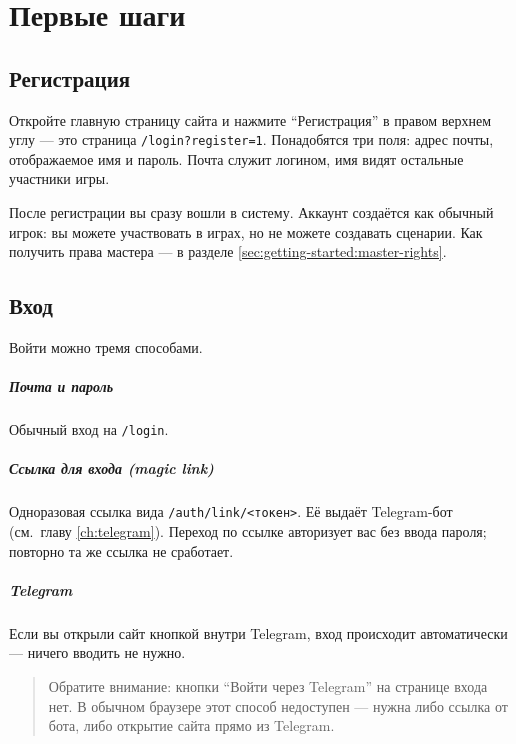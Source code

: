 \chapter{Первые шаги}
\label{ch:getting-started}

\section{Регистрация}
\label{sec:getting-started:register}

Откройте главную страницу сайта и нажмите ``Регистрация'' в правом верхнем углу --- это страница \texttt{/login?register=1}. Понадобятся три поля: адрес почты, отображаемое имя и пароль. Почта служит логином, имя видят остальные участники игры.


После регистрации вы сразу вошли в систему. Аккаунт создаётся как обычный игрок: вы можете участвовать в играх, но не можете создавать сценарии. Как получить права мастера --- в разделе \ref{sec:getting-started:master-rights}.

\section{Вход}
\label{sec:getting-started:login}

Войти можно тремя способами.

\paragraph{Почта и пароль}
Обычный вход на \texttt{/login}.

\paragraph{Ссылка для входа (magic link)}
Одноразовая ссылка вида \texttt{/auth/link/<токен>}. Её выдаёт Telegram-бот (см.\ главу \ref{ch:telegram}). Переход по ссылке авторизует вас без ввода пароля; повторно та же ссылка не сработает.

\paragraph{Telegram}
Если вы открыли сайт кнопкой внутри Telegram, вход происходит автоматически --- ничего вводить не нужно.

\begin{quote}
\small
Обратите внимание: кнопки ``Войти через Telegram'' на странице входа нет. В обычном браузере этот способ недоступен --- нужна либо ссылка от бота, либо открытие сайта прямо из Telegram.
\end{quote}


